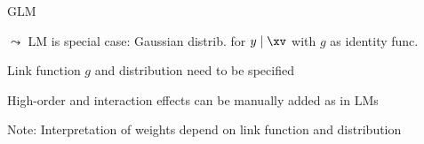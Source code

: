 \documentclass[10pt,compress,t,notes=noshow, xcolor=table]{beamer}
\begin{document}
\begin{framev}[align=top]{GLM }
\begin{itemizeM}
$\leadsto$ LM is special case: Gaussian distrib. for $y \mid \xv$ with $g$ as identity func.
\item Link function $g$ and distribution need to be specified
\item High-order and interaction effects can be manually added as in LMs
\item Note: Interpretation of weights depend on link function and distribution
\end{itemizeM}
\end{framev}
\end{document}
